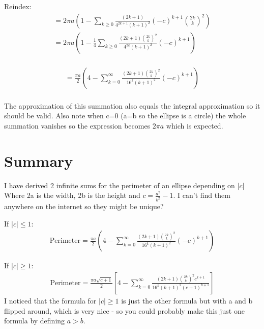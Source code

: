 \documentclass{article}
\begin{document}
Reindex:
\begin{equation*}
\begin{split}
	= 2\pi a\left(1-\sum_{k\geq 0}\frac{(2k+1)}{4^{2k+1}(k+1)^2}(-c)^{k+1}{{2k}\choose{k}}^2\right)\\
	= 2\pi a\left(1-\frac{1}{4}\sum_{k\geq 0}\frac{(2k+1){{2k}\choose{k}}^2}{4^{2k}(k+1)^2}(-c)^{k+1}\right)\\
\end{split}
\end{equation*}
\begin{tcolorbox}
\begin{equation*}
\begin{split}
	= \frac{\pi a}{2}\left(4-\sum_{k=0}^{\infty}\frac{(2k+1){{2k}\choose{k}}^2}{16^k(k+1)^2}(-c)^{k+1}\right)\\
\end{split}
\end{equation*}
\end{tcolorbox}
The approximation of this summation also equals the integral approximation so it should be valid. Also note when c=0 (a=b so the ellipse is a circle) the whole summation vanishes so the expression becomes $2\pi a$ which is expected.



\section{Summary}
I have derived 2 infinite sums for the perimeter of an ellipse depending on $|c|$ Where 2a is the width, 2b is the height and $c=\frac{a^2}{b^2}-1$. I can't find them anywhere on the internet so they might be unique?
\begin{equation*}
\end{equation*}

If $|c| \leq 1$:
\begin{equation*}
\begin{split}
	\text{Perimeter} = \frac{\pi a}{2}\left(4-\sum_{k=0}^{\infty}\frac{(2k+1){{2k}\choose{k}}^2}{16^k(k+1)^2}(-c)^{k+1}\right)
\end{split}
\end{equation*}

If $|c| \geq 1$:
\begin{equation*}
\begin{split}
	\text{Perimeter} = \frac{\pi a\sqrt{c+1}}{2} \left[4 - \sum_{k=0}^{\infty}\frac{(2k+1){{2k}\choose k}^2c^{k+1}}{16^k(k+1)^2(c+1)^{k+1}}\right]
\end{split}
\end{equation*}
I noticed that the formula for $|c| \geq 1$ is just the other formula but with a and b flipped around, which is very nice - so you could probably make this just one formula by defining $a > b$.
\end{document}
